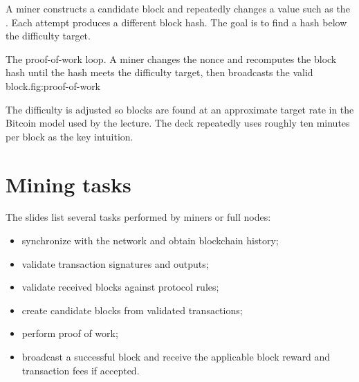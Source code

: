 A miner constructs a candidate block and repeatedly changes a value such as the . Each attempt produces a different block hash. The goal is to find a hash below the difficulty target.

\begin{utpfig}{The proof-of-work loop. A miner changes the nonce and recomputes the block hash until the hash meets the difficulty target, then broadcasts the valid block.}{fig:proof-of-work}
\end{utpfig}

The difficulty is adjusted so blocks are found at an approximate target rate in the Bitcoin model used by the lecture. The deck repeatedly uses roughly ten minutes per block as the key intuition.

\section{Mining tasks}

The slides list several tasks performed by miners or full nodes:

\begin{itemize}
  \item synchronize with the network and obtain blockchain history;
  \item validate transaction signatures and outputs;
  \item validate received blocks against protocol rules;
  \item create candidate blocks from validated transactions;
  \item perform proof of work;
  \item broadcast a successful block and receive the applicable block reward and transaction fees if accepted.
\end{itemize}

